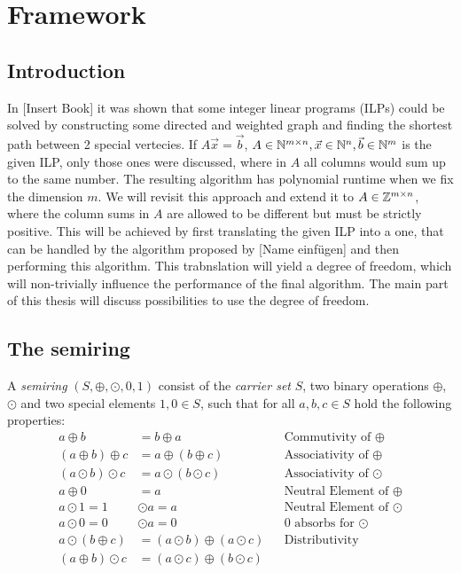 \chapter{Framework}
\section{Introduction}
In [Insert Book] it was shown that some integer linear programs (ILPs) could be solved by constructing some directed and weighted graph and finding the shortest path between 2 special vertecies. If $A\vec x = \vec b$, $A\in \mathbb{N}^{m \times n}, \vec x \in \mathbb{N}^n, \vec b \in \mathbb{N}^m$ is the given ILP, only those ones were discussed, where in $A$ all columns would sum up to the same number. The resulting algorithm has polynomial runtime when we fix the dimension $m$. We will revisit this approach and extend it to $A\in\mathbb{Z}^{m \times n}$, where the column sums in $A$ are allowed to be different but must be strictly positive. This will be achieved by first translating the given ILP into a one, that can be handled by the algorithm proposed by [Name einfügen] and then performing this algorithm. This trabnslation will yield a degree of freedom, which will non-trivially influence the performance of the final algorithm. The main part of this thesis will discuss possibilities to use the degree of freedom. 

\section{The semiring}
\begin{definition}
    A \textit{semiring} $(S, \oplus, \odot, 0, 1)$ consist of the \textit{carrier set} $S$, two binary operations $\oplus$,$\odot$ and two special elements $1, 0 \in S$, such that for all $a, b, c \in S$ hold the following properties:
    \begin{align*}
        a \oplus b &= b \oplus a &&\textrm{Commutivity of $\oplus$}\\
        (a \oplus b) \oplus c &= a \oplus (b \oplus c) &&\textrm{Associativity of $\oplus$}\\
        (a \odot b) \odot c &= a \odot (b \odot c) &&\textrm{Associativity of $\odot$}\\
        a \oplus 0 &= a &&\textrm{Neutral Element of $\oplus$}\\
        a \odot 1 = 1 &\odot a = a &&\textrm{Neutral Element of $\odot$}\\
        a \odot 0 = 0 &\odot a = 0 &&\textrm{0 absorbs for $\odot$}\\
        a \odot (b \oplus c) &= (a \odot b) \oplus (a \odot c) &&\textrm{Distributivity}\\
        (a \oplus b) \odot c &= (a \odot c) \oplus (b \odot c)
    \end{align*}
\end{definition}

